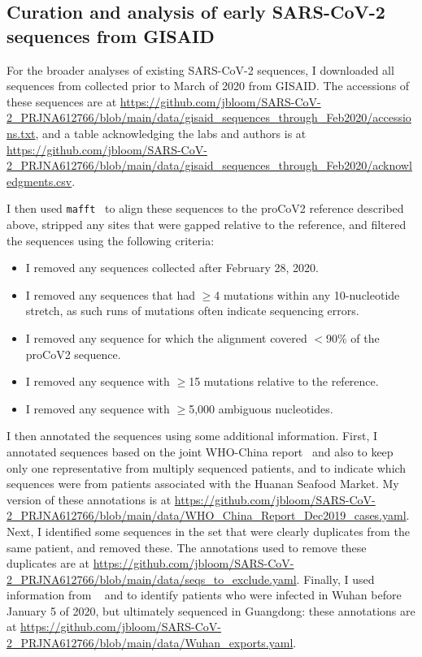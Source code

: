 \documentclass[9pt,twocolumn,twoside]{gsajnl_modified}
\begin{document}
{\subsection{Curation and analysis of early SARS-CoV-2 sequences from GISAID}
For the broader analyses of existing SARS-CoV-2 sequences, I downloaded all sequences from collected prior to March of 2020 from GISAID.
The accessions of these sequences are at \url{https://github.com/jbloom/SARS-CoV-2_PRJNA612766/blob/main/data/gisaid_sequences_through_Feb2020/accessions.txt}, and a table acknowledging the labs and authors is at \url{https://github.com/jbloom/SARS-CoV-2_PRJNA612766/blob/main/data/gisaid_sequences_through_Feb2020/acknowledgments.csv}.

I then used \texttt{mafft}~\citep{katoh2013mafft} to align these sequences to the proCoV2 reference described above, stripped any sites that were gapped relative to the reference, and filtered the sequences using the following criteria:
\begin{itemize}
\item I removed any sequences collected after February 28, 2020.
\item I removed any sequences that had $\ge$4 mutations within any 10-nucleotide stretch, as such runs of mutations often indicate sequencing errors.
\item I removed any sequence for which the alignment covered $<$90\% of the proCoV2 sequence.
\item I removed any sequence with $\ge$15 mutations relative to the reference.
\item I removed any sequence with $\ge$5,000 ambiguous nucleotides.
\end{itemize}

I then annotated the sequences using some additional information.
First, I annotated sequences based on the joint WHO-China report~\citep{WHO2021origins} and also \citet{zhu2020brief} to keep only one representative from multiply sequenced patients, and to indicate which sequences were from patients associated with the Huanan Seafood Market.
My version of these annotations is at \url{https://github.com/jbloom/SARS-CoV-2_PRJNA612766/blob/main/data/WHO_China_Report_Dec2019_cases.yaml}.
Next, I identified some sequences in the set that were clearly duplicates from the same patient, and removed these.
The annotations used to remove these duplicates are at \url{https://github.com/jbloom/SARS-CoV-2_PRJNA612766/blob/main/data/seqs_to_exclude.yaml}.
Finally, I used information from ~\citet{chan2020familial} and \citet{kang2020evidence} to identify patients who were infected in Wuhan before January 5 of 2020, but ultimately sequenced in Guangdong: these annotations are at \url{https://github.com/jbloom/SARS-CoV-2_PRJNA612766/blob/main/data/Wuhan_exports.yaml}.

}
\end{document}
